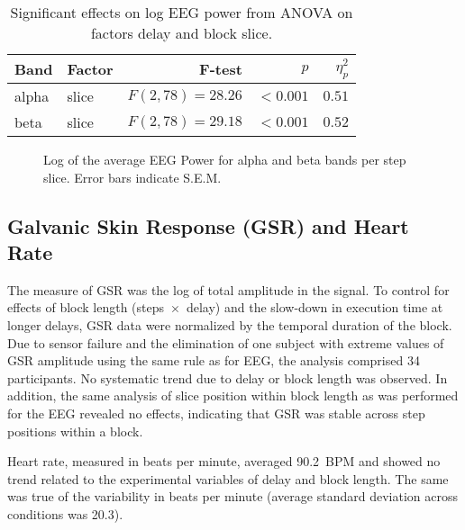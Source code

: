 \documentclass[10pt,letterpaper]{article}
\providecommand{\DIFaddtex}[1]{#1} %
\providecommand{\DIFdeltex}[1]{} %
\providecommand{\DIFaddFL}[1]{\DIFadd{#1}} %
\providecommand{\DIFdelFL}[1]{\DIFdel{#1}} %
\providecommand{\DIFaddbeginFL}{} %
\providecommand{\DIFaddendFL}{} %
\providecommand{\DIFdelbeginFL}{} %
\providecommand{\DIFdelendFL}{} %
\providecommand{\DIFadd}[1]{\texorpdfstring{\DIFaddtex{#1}}{#1}} %
\providecommand{\DIFdel}[1]{\texorpdfstring{\DIFdeltex{#1}}{}} %
\newcommand{\DIFscaledelfig}{0.5}
\newlength{\DIFdelgraphicswidth} %
\newlength{\DIFdelgraphicsheight} %
\newcommand{\DIFaddincludegraphics}[2][]{{\color{blue}\fbox{\DIFOincludegraphics[#1]{#2}}}} %
\newcommand{\DIFdelincludegraphics}[2][]{%
\sbox{\DIFdelgraphicsbox}{\DIFOincludegraphics[#1]{#2}}%
\settoboxwidth{\DIFdelgraphicswidth}{\DIFdelgraphicsbox} %
\settoboxtotalheight{\DIFdelgraphicsheight}{\DIFdelgraphicsbox} %
\scalebox{\DIFscaledelfig}{%
\parbox[b]{\DIFdelgraphicswidth}{\usebox{\DIFdelgraphicsbox}\\[-\baselineskip] \rule{\DIFdelgraphicswidth}{0em}}\llap{\resizebox{\DIFdelgraphicswidth}{\DIFdelgraphicsheight}{%
\setlength{\unitlength}{\DIFdelgraphicswidth}%
\begin{picture}(1,1)%
\thicklines\linethickness{2pt} %
{\color[rgb]{1,0,0}\put(0,0){\framebox(1,1){}}}%
{\color[rgb]{1,0,0}\put(0,0){\line( 1,1){1}}}%
{\color[rgb]{1,0,0}\put(0,1){\line(1,-1){1}}}%
\end{picture}%
}\hspace*{3pt}}} %
} %
\DeclareRobustCommand{\DIFaddbeginFL}{\DIFOaddbeginFL \let\includegraphics\DIFaddincludegraphics} %
\DeclareRobustCommand{\DIFaddendFL}{\DIFOaddendFL \let\includegraphics\DIFOincludegraphics} %
\DeclareRobustCommand{\DIFdelbeginFL}{\DIFOdelbeginFL \let\includegraphics\DIFdelincludegraphics} %
\DeclareRobustCommand{\DIFdelendFL}{\DIFOaddendFL \let\includegraphics\DIFOincludegraphics} %
\begin{document}
\begin{table}[h]
  \centering
  \caption{Significant effects on log EEG power from ANOVA on factors delay and block slice.}\label{tab:anova:egg:alphabeta}
  \setlength{\tabcolsep}{0pt} %
  \begin{tabular*}{\columnwidth}{@{\extracolsep{\fill}\quad}llrrr}
    \toprule
    \textbf{Band} & \textbf{Factor} & \textbf{F-test} & \textbf{\(p\)} & \textbf{\( \eta^{2}_{p} \)} \\ \midrule
    alpha   & slice & \( F(2, 78) = 28.26 \) & \( <0.001 \) & \( 0.51 \) \\ %
    beta    & slice & \( F(2, 78) = 29.18 \) & \( <0.001 \) & \( 0.52 \) \\ 
    \bottomrule
  \end{tabular*}
\end{table}

\begin{figure}[h]
    \centering
    \caption{\DIFdelbeginFL \DIFdelFL{Mean }\DIFdelendFL Log \DIFaddbeginFL \DIFaddFL{of the average }\DIFaddendFL EEG Power for alpha and beta bands per step slice. Error bars indicate S.E.M.}\label{fig:logeegpow:slices}
\end{figure}

\subsection{Galvanic Skin Response (GSR) and Heart Rate}
The measure of GSR was the log of total amplitude in the signal.
To control for effects of block length (steps~\( \times \)~delay) and the slow-down in execution time at longer delays, GSR data were normalized by the temporal duration of the block.
Due to sensor failure and the elimination of one subject with extreme values of GSR amplitude using the same rule as for EEG, the analysis comprised 34 participants.
No systematic trend due to delay or block length was observed.
In addition, the same analysis of slice position within block length as was performed for the EEG revealed no effects, indicating that GSR was stable across step positions within a block. 

Heart rate, measured in beats per minute, averaged \num{90.2}~BPM and showed no trend related to the experimental variables of delay and block length.
The same was true of the variability in beats per minute (average standard deviation across conditions was \num{20.3}).
\end{document}
